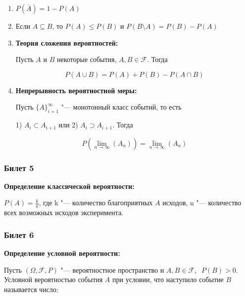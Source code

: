     \begin{enumerate}
        \item{$P(\overline{A}) = 1 - P(A)$}
        \item{Если $A \subseteq B$, то 
        $ P(A) \leq P(B)$ и $P(B \setminus A) = 
        P(B) - P(A)$}
        \item{
            \textbf{Теория сложения вероятностей:}
                \smallskip
                
                Пусть $A$ и $B$ некоторые события,
                $A, B \in \mathcal{F}$. Тогда 

                \[
                    P(A \cup B) = P(A) + P(B) -
                    P(A \cap B)
                \]
        }
        \item{
            \textbf{Непрерывность вероятностной
            меры:}
                \smallskip

                Пусть $\{A\}_{i = 1}^{\infty}$ "---
                монотонный класс событий, то есть

                1) $A_i \subset A_{i + 1}$ или
                2) $A_i \supset A_{i + 1}$. Тогда

                \[
                    P(\lim\limits_{n \to \infty} (A_n)) =
                    \lim\limits_{n \to \infty} (A_n)
                \]
        }
    \end{enumerate}
    \bigskip

\subsubsection{Билет 5}

\textbf{Определение классической вероятности:}
    \smallskip

    $P(A) = \frac{k}{n}$, где k "--- количество
    благоприятных $A$ исходов, n "--- количество
    всех возможных исходов эксперимента.
    \bigskip

\subsubsection{Билет 6}

\textbf{Определение условной вероятности:}
    \smallskip

    Пусть $(\Omega, \mathcal{F}, P)$ "--- 
    вероятностное пространство и $A, B \in
    \mathcal{F}, \;\; P(B) > 0$. Условной
    вероятностью события $A$ при условии, что
    наступило событие $B$ называется число:

